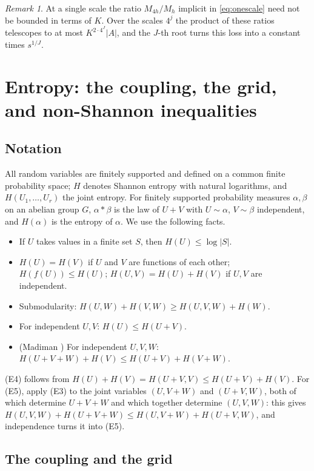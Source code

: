 \documentclass[11pt]{amsart}
\theoremstyle{definition}
\theoremstyle{remark}
\newtheorem{remark}[theorem]{Remark}
\numberwithin{equation}{section}
\begin{document}
\begin{remark}
At a single scale the ratio $M_{4h}/M_h$ implicit in \eqref{eq:onescale} need not be bounded in
terms of $K$. Over the scales $4^j$ the product of these ratios telescopes to at most
$K^{2\cdot4^J}|A|$, and the $J$-th root turns this loss into a constant times $s^{1/J}$.
\end{remark}

\section{Entropy: the coupling, the grid, and non-Shannon inequalities}\label{sec:entropy}

\subsection{Notation}
All random variables are finitely supported and defined on a common finite probability space;
$H$ denotes Shannon entropy with natural logarithms, and $H(U_1,\dots,U_r)$ the joint entropy.
For finitely supported probability measures $\alpha,\beta$ on an abelian group $G$, $\alpha*\beta$
is the law of $U+V$ with $U\sim\alpha$, $V\sim\beta$ independent, and $H(\alpha)$ is the entropy of
$\alpha$. We use the following facts.
\begin{itemize}
\item[(E1)] If $U$ takes values in a finite set $S$, then $H(U)\le\log|S|$.
\item[(E2)] $H(U)=H(V)$ if $U$ and $V$ are functions of each other; $H(f(U))\le H(U)$;
  $H(U,V)=H(U)+H(V)$ if $U,V$ are independent.
\item[(E3)] Submodularity: $H(U,W)+H(V,W)\ge H(U,V,W)+H(W)$.
\item[(E4)] For independent $U,V$: $H(U)\le H(U+V)$.
\item[(E5)] (Madiman \cite{Mad08}) For independent $U,V,W$:
  $H(U+V+W)+H(V)\le H(U+V)+H(V+W)$.
\end{itemize}
(E4) follows from $H(U)+H(V)=H(U+V,V)\le H(U+V)+H(V)$. For (E5), apply (E3) to the joint
variables $(U,V+W)$ and $(U+V,W)$, both of which determine $U+V+W$ and which together determine
$(U,V,W)$: this gives $H(U,V,W)+H(U+V+W)\le H(U,V+W)+H(U+V,W)$, and independence turns it into
(E5).

\subsection{The coupling and the grid}
\end{document}
